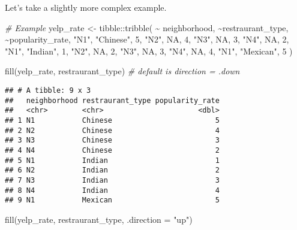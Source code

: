 \documentclass[
]{book}
\newenvironment{Shaded}{\begin{snugshade}}{\end{snugshade}}
\newcommand{\AttributeTok}[1]{\textcolor[rgb]{0.77,0.63,0.00}{#1}}
\newcommand{\CommentTok}[1]{\textcolor[rgb]{0.56,0.35,0.01}{\textit{#1}}}
\newcommand{\ConstantTok}[1]{\textcolor[rgb]{0.00,0.00,0.00}{#1}}
\newcommand{\DecValTok}[1]{\textcolor[rgb]{0.00,0.00,0.81}{#1}}
\newcommand{\FunctionTok}[1]{\textcolor[rgb]{0.00,0.00,0.00}{#1}}
\newcommand{\NormalTok}[1]{#1}
\newcommand{\OtherTok}[1]{\textcolor[rgb]{0.56,0.35,0.01}{#1}}
\newcommand{\SpecialCharTok}[1]{\textcolor[rgb]{0.00,0.00,0.00}{#1}}
\newcommand{\StringTok}[1]{\textcolor[rgb]{0.31,0.60,0.02}{#1}}
\begin{document}
Let's take a slightly more complex example.

\begin{Shaded}
\begin{Highlighting}[]
\CommentTok{\# Example }
\NormalTok{yelp\_rate }\OtherTok{\textless{}{-}}\NormalTok{ tibble}\SpecialCharTok{::}\FunctionTok{tribble}\NormalTok{(}
  \SpecialCharTok{\textasciitilde{}}\NormalTok{ neighborhood, }\SpecialCharTok{\textasciitilde{}}\NormalTok{restraurant\_type, }\SpecialCharTok{\textasciitilde{}}\NormalTok{popularity\_rate, }
  \StringTok{"N1"}\NormalTok{, }\StringTok{"Chinese"}\NormalTok{, }\DecValTok{5}\NormalTok{, }
  \StringTok{"N2"}\NormalTok{, }\ConstantTok{NA}\NormalTok{, }\DecValTok{4}\NormalTok{,   }
  \StringTok{"N3"}\NormalTok{, }\ConstantTok{NA}\NormalTok{, }\DecValTok{3}\NormalTok{,  }
  \StringTok{"N4"}\NormalTok{, }\ConstantTok{NA}\NormalTok{, }\DecValTok{2}\NormalTok{,  }
  \StringTok{"N1"}\NormalTok{, }\StringTok{"Indian"}\NormalTok{, }\DecValTok{1}\NormalTok{, }
  \StringTok{"N2"}\NormalTok{, }\ConstantTok{NA}\NormalTok{, }\DecValTok{2}\NormalTok{,  }
  \StringTok{"N3"}\NormalTok{, }\ConstantTok{NA}\NormalTok{, }\DecValTok{3}\NormalTok{,  }
  \StringTok{"N4"}\NormalTok{, }\ConstantTok{NA}\NormalTok{, }\DecValTok{4}\NormalTok{, }
  \StringTok{"N1"}\NormalTok{, }\StringTok{"Mexican"}\NormalTok{, }\DecValTok{5}
\NormalTok{)}

\FunctionTok{fill}\NormalTok{(yelp\_rate, restraurant\_type) }\CommentTok{\# default is direction = .down }
\end{Highlighting}
\end{Shaded}

\begin{verbatim}
## # A tibble: 9 x 3
##   neighborhood restraurant_type popularity_rate
##   <chr>        <chr>                      <dbl>
## 1 N1           Chinese                        5
## 2 N2           Chinese                        4
## 3 N3           Chinese                        3
## 4 N4           Chinese                        2
## 5 N1           Indian                         1
## 6 N2           Indian                         2
## 7 N3           Indian                         3
## 8 N4           Indian                         4
## 9 N1           Mexican                        5
\end{verbatim}

\begin{Shaded}
\begin{Highlighting}[]
\FunctionTok{fill}\NormalTok{(yelp\_rate, restraurant\_type, }\AttributeTok{.direction =} \StringTok{"up"}\NormalTok{) }
\end{Highlighting}
\end{Shaded}
\end{document}
